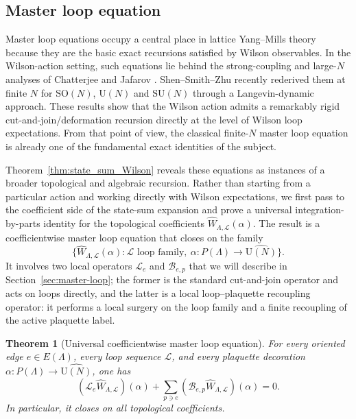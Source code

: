 \documentclass[11pt,a4paper,reqno]{article}
\newtheorem{theorem}{Theorem}[section]
\theoremstyle{definition}
\theoremstyle{remark}
\newcommand\SU{{\mathrm{SU}}}
\newcommand\SO{{\mathrm{SO}}}
\newcommand\U{{\mathrm U}}
\newcommand\Lc{{\mathcal{L}}}
\begin{document}
\subsection{Master loop equation}

Master loop equations occupy a central place in lattice Yang--Mills theory because they are the basic exact recursions satisfied by Wilson observables. In the Wilson-action setting, such equations lie behind the strong-coupling and large-$N$ analyses of Chatterjee and Jafarov \cite{Cha19,Jaf16}. Shen--Smith--Zhu \cite{SSZ24} recently rederived them at finite $N$ for $\SO(N)$, $\U(N)$ and $\SU(N)$ through a Langevin-dynamic approach. These results show that the Wilson action admits a remarkably rigid cut-and-join/deformation recursion directly at the level of Wilson loop expectations. From that point of view, the classical finite-$N$ master loop equation is already one of the fundamental exact identities of the subject.

Theorem~\ref{thm:state_sum_Wilson} reveals these equations as instances of a broader topological and algebraic recursion. Rather than starting from a particular action and working directly with Wilson expectations, we first pass to the coefficient side of the state-sum expansion and prove a universal integration-by-parts identity for the topological coefficients $\widehat W_{\Lambda,\Lc}(\alpha)$. The result is a coefficientwise master loop equation that closes on the family
\[
\bigl\{\widehat W_{\Lambda,\Lc}(\alpha): \Lc \text{ loop family},\ \alpha:P(\Lambda)\to\widehat{\U(N)}\bigr\}.
\]
It involves two local operators $\mathscr{L}_e$ and $\mathscr{B}_{e,p}$ that we will describe in Section~\ref{sec:master-loop}; the former is the standard cut-and-join operator and acts on loops directly, and the latter is a local loop--plaquette recoupling operator: it performs a local surgery on the loop family and a finite recoupling of the active plaquette label.

\begin{theorem}[Universal coefficientwise master loop equation]
\label{thm:universal-coefficientwise-master-equation}
For every oriented edge $e\in E(\Lambda)$, every loop sequence $\Lc$, and every plaquette decoration
$\alpha:P(\Lambda)\to \widehat{\U(N)}$, one has
\begin{equation}\label{eq:master-equation}
(\mathscr L_e \widehat{W}_{\Lambda,\Lc})(\alpha)+\sum_{p\ni e}( \mathscr{B}_{e,p}\widehat{W}_{\Lambda,\Lc})(\alpha)=0.
\end{equation}
In particular, it closes on all topological coefficients.
\end{theorem}
\end{document}
